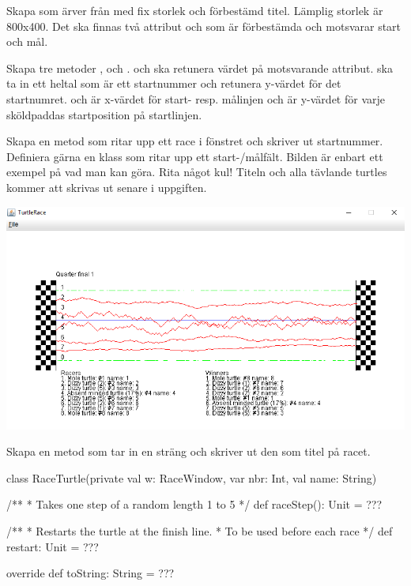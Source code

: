 \Task {}

\Subtask Skapa  som ärver från  med fix storlek och förbestämd titel. Lämplig storlek är 800x400. Det ska finnas två attribut  och  som är förbestämda och motsvarar start och mål.

\Subtask Skapa tre metoder ,  och .  och  ska retunera värdet på motsvarande attribut.  ska ta in ett heltal  som är ett startnummer och retunera y-värdet för det startnumret.  och  är x-värdet för start- resp. målinjen och  är y-värdet för varje sköldpaddas startposition på startlinjen.

\Subtask Skapa en metod  som ritar upp ett race i fönstret och skriver ut startnummer. Definiera gärna en klass som ritar upp ett start-/målfält. Bilden är enbart ett exempel på vad man kan göra. Rita något kul! Titeln och alla tävlande turtles kommer att skrivas ut senare i uppgiften.

\includegraphics[width=\textwidth]{../img/turtlerace/RaceWindow}

\Subtask Skapa en metod  som tar in en sträng och skriver ut den som titel på racet.

\begin{Code}
class RaceTurtle(private val w: RaceWindow,
			var nbr: Int, val name: String) {
  /**
   * Takes one step of a random length 1 to 5
   */
  def raceStep(): Unit = ???

  /**
   * Restarts the turtle at the finish line.
   * To be used before each race
   */
  def restart: Unit = ???

  override def toString: String = ???
}
\end{Code}

